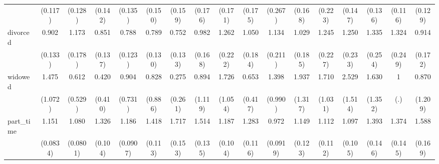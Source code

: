 {\begin{tabular}{l*{16}{c}}
                    &     (0.117)         &     (0.128)         &     (0.142)         &     (0.135)         &     (0.150)         &     (0.159)         &     (0.176)         &     (0.171)         &     (0.175)         &     (0.267)         &     (0.168)         &     (0.223)         &     (0.147)         &     (0.136)         &     (0.116)         &     (0.129)         \\
[1em]
divorced            &       0.902         &       1.173         &       0.851         &       0.788         &       0.789         &       0.752         &       0.982         &       1.262         &       1.050         &       1.134         &       1.029         &       1.245         &       1.250         &       1.335         &       1.324         &       0.914         \\
                    &     (0.133)         &     (0.178)         &     (0.137)         &     (0.123)         &     (0.130)         &     (0.133)         &     (0.168)         &     (0.222)         &     (0.184)         &     (0.211)         &     (0.185)         &     (0.227)         &     (0.233)         &     (0.254)         &     (0.249)         &     (0.172)         \\
[1em]
widowed             &       1.475         &       0.612         &       0.420         &       0.904         &       0.828         &       0.275         &       0.894         &       1.726         &       0.653         &       1.398         &       1.937         &       1.710         &       2.529         &       1.630         &           1         &       0.870         \\
                    &     (1.072)         &     (0.529)         &     (0.410)         &     (0.731)         &     (0.886)         &     (0.261)         &     (1.119)         &     (1.054)         &     (0.417)         &     (0.990)         &     (1.317)         &     (1.031)         &     (1.514)         &     (1.352)         &         (.)         &     (1.209)         \\
[1em]
part\_time           &       1.151         &       1.080         &       1.326\sym{***}&       1.186\sym{*}  &       1.418\sym{***}&       1.717\sym{***}&       1.514\sym{***}&       1.187         &       1.283\sym{**} &       0.972         &       1.149         &       1.112         &       1.097         &       1.393\sym{**} &       1.374\sym{**} &       1.588\sym{***}\\
                    &    (0.0834)         &    (0.0801)         &     (0.104)         &    (0.0907)         &     (0.113)         &     (0.153)         &     (0.135)         &     (0.104)         &     (0.116)         &    (0.0919)         &     (0.123)         &     (0.112)         &     (0.105)         &     (0.146)         &     (0.145)         &     (0.169)         \\

\end{tabular}}
